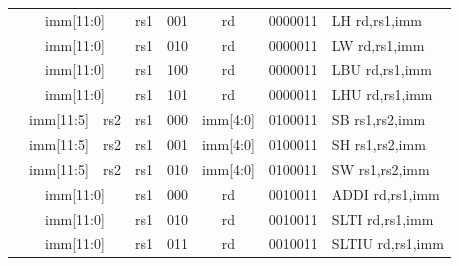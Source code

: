 \documentclass[11pt]{article}
\begin{document}
{\begin{table}[H]
\begin{small}
\begin{center}
\begin{tabular}{p{0in}p{0.4in}p{0.05in}p{0.05in}p{0.05in}p{0.05in}p{0.4in}p{0.6in}p{0.4in}p{0.6in}p{0.7in}l}
&
\multicolumn{6}{|c|}{imm[11:0]} &
\multicolumn{1}{c|}{rs1} &
\multicolumn{1}{c|}{001} &
\multicolumn{1}{c|}{rd} &
\multicolumn{1}{c|}{0000011} & LH rd,rs1,imm \\
\cline{2-11}


&
\multicolumn{6}{|c|}{imm[11:0]} &
\multicolumn{1}{c|}{rs1} &
\multicolumn{1}{c|}{010} &
\multicolumn{1}{c|}{rd} &
\multicolumn{1}{c|}{0000011} & LW rd,rs1,imm \\
\cline{2-11}


&
\multicolumn{6}{|c|}{imm[11:0]} &
\multicolumn{1}{c|}{rs1} &
\multicolumn{1}{c|}{100} &
\multicolumn{1}{c|}{rd} &
\multicolumn{1}{c|}{0000011} & LBU rd,rs1,imm \\
\cline{2-11}


&
\multicolumn{6}{|c|}{imm[11:0]} &
\multicolumn{1}{c|}{rs1} &
\multicolumn{1}{c|}{101} &
\multicolumn{1}{c|}{rd} &
\multicolumn{1}{c|}{0000011} & LHU rd,rs1,imm \\
\cline{2-11}


&
\multicolumn{4}{|c|}{imm[11:5]} &
\multicolumn{2}{c|}{rs2} &
\multicolumn{1}{c|}{rs1} &
\multicolumn{1}{c|}{000} &
\multicolumn{1}{c|}{imm[4:0]} &
\multicolumn{1}{c|}{0100011} & SB rs1,rs2,imm \\
\cline{2-11}


&
\multicolumn{4}{|c|}{imm[11:5]} &
\multicolumn{2}{c|}{rs2} &
\multicolumn{1}{c|}{rs1} &
\multicolumn{1}{c|}{001} &
\multicolumn{1}{c|}{imm[4:0]} &
\multicolumn{1}{c|}{0100011} & SH rs1,rs2,imm \\
\cline{2-11}


&
\multicolumn{4}{|c|}{imm[11:5]} &
\multicolumn{2}{c|}{rs2} &
\multicolumn{1}{c|}{rs1} &
\multicolumn{1}{c|}{010} &
\multicolumn{1}{c|}{imm[4:0]} &
\multicolumn{1}{c|}{0100011} & SW rs1,rs2,imm \\
\cline{2-11}


&
\multicolumn{6}{|c|}{imm[11:0]} &
\multicolumn{1}{c|}{rs1} &
\multicolumn{1}{c|}{000} &
\multicolumn{1}{c|}{rd} &
\multicolumn{1}{c|}{0010011} & ADDI rd,rs1,imm \\
\cline{2-11}


&
\multicolumn{6}{|c|}{imm[11:0]} &
\multicolumn{1}{c|}{rs1} &
\multicolumn{1}{c|}{010} &
\multicolumn{1}{c|}{rd} &
\multicolumn{1}{c|}{0010011} & SLTI rd,rs1,imm \\
\cline{2-11}


&
\multicolumn{6}{|c|}{imm[11:0]} &
\multicolumn{1}{c|}{rs1} &
\multicolumn{1}{c|}{011} &
\multicolumn{1}{c|}{rd} &
\multicolumn{1}{c|}{0010011} & SLTIU rd,rs1,imm \\
\cline{2-11}



\end{tabular}
\end{center}
\end{small}
\end{table}}
\end{document}
